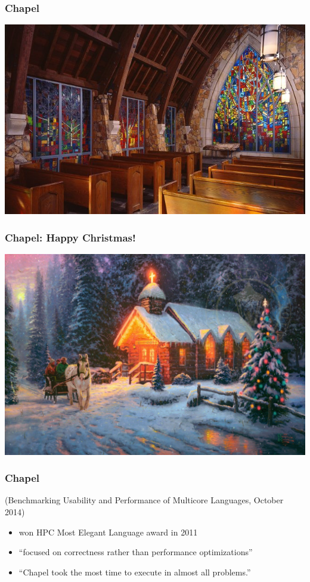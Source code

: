 \documentclass{beamer}
\begin{document}
\begin{frame}
 \frametitle{Chapel}
 \includegraphics[width=\textwidth]{chapel.jpg}
\end{frame}
 
\begin{frame}
 \frametitle{Chapel: Happy Christmas!}
 \includegraphics[width=\textwidth]{chrcha.jpg}
\end{frame}

\begin{frame}[fragile]
 \frametitle{Chapel}
(Benchmarking Usability and Performance of Multicore Languages, October 2014)
\begin{itemize}
\item won HPC Most Elegant Language award in 2011
\pause
\item ``focused on correctness rather than performance optimizations''
\pause
\item ``Chapel took the most time to execute in almost all problems.''
\end{itemize}
\end{frame}
\end{document}

